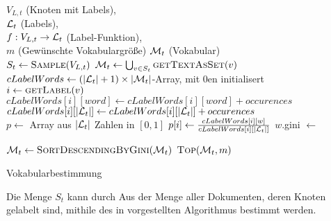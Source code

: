 \begin{algorithm}
    \begin{algorithmic}[1]
        \Require \\
                 $V_{L,t}$ (Knoten mit Labels),\\
                 $\mathcal{L}_t$ (Labels),\\
                 $f:V_{L,t} \rightarrow \mathcal{L}_t$ (Label-Funktion),\\
                 $m$ (Gewünschte Vokabulargröße)
        \Ensure  $\mathcal{M}_t$ (Vokabular)\\

        \State $S_t \gets \Call{Sample}{V_{L,t}}$ 
        \State $\M_t \gets \bigcup_{v \in S_t} \Call{getTextAsSet}{v}$ 
        \State $cLabelWords \gets (|\mathcal{L}_t|+1) \times |\mathcal{M}_t|$-Array, mit 0en initialisert\\

         
            \State $i \gets \Call{getLabel}{v}$
                \State $cLabelWords[i][word] \gets cLabelWords[i][word] + occurences$
                \State $cLabelWords[i][|\mathcal{L}_t|] \gets cLabelWords[i][|\mathcal{L}_t|] + occurences$
            \EndFor
        \EndFor
        \\
            \State $p \gets $ Array aus $|\mathcal{L}_t|$ Zahlen in $[0, 1]$
                \State $p[i] \gets \frac{cLabelWords[i][w]}{cLabelWords[i][|\mathcal{L}_t|]}$
            \EndFor
            \State $w$.gini $\gets$ 
        \EndFor

        \State $\M_t \gets \Call{SortDescendingByGini}{\M_t}$
        \State \Return $\Call{Top}{\M_t, m}$
    \end{algorithmic}
\caption{Vokabularbestimmung}
\label{alg:vokabularbestimmung}
\end{algorithm}

Die Menge $S_t$ kann durch Aus der Menge aller Dokumenten, deren 
Knoten gelabelt sind, mithile des in \cite{Vitter} vorgestellten
Algorithmus bestimmt werden.
